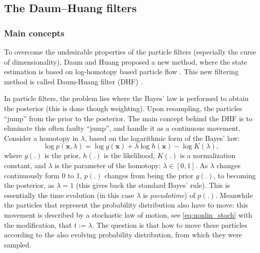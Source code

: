 \subsection{The Daum--Huang filters}
\subsubsection{Main concepts}
To overcome the  undesirable properties of the particle filters (especially the curse of dimensionality), Daum and Huang proposed a new method, where the state estimation is based on log-homotopy based particle flow \cite{dhf_first}. This new filtering method is called Daum-Huang filter (DHF) \cite{dhf_name}.

In particle filters, the problem lies where the Bayes' law is performed to obtain the posterior (this is done though weighting). Upon resampling, the particles ``jump'' from the prior to the posterior. The main concept behind the DHF is to eliminate this often faulty ``jump'', and handle it as a continuous movement. Consider a homotopy in $\lambda$, based on the logarithmic form of the Bayes' law:
\begin{equation}\label{eq:bayes-loghom}
    \log p(\mathbf{x},\lambda) = \log g(\mathbf{x}) + \lambda \log h(\mathbf{x}) - \log K(\lambda),
\end{equation}
where $g(.)$ is the prior, $h(.)$ is the likelihood, $K(.)$ is a normalization constant, and $\lambda$ is the parameter of the homotopy: $\lambda \in [0,1]$. As $\lambda$ changes continuously form 0 to 1, $p(.)$ changes from being the prior $g(.)$, to becoming the posterior, as $\lambda = 1$ (this gives back the standard Bayes' rule). This is essentially the time evolution (in this case $\lambda$ is \emph{pseudotime}) of $p(.)$. Meanwhile the particles that represent the probability distribution also have to move: this movement is described by a stochastic law of motion, see \eqref{eq:nonlin_stoch} with the modification, that $t := \lambda$. The question is that how to move these particles according to the also evolving probability distribution, from which they were sampled.

